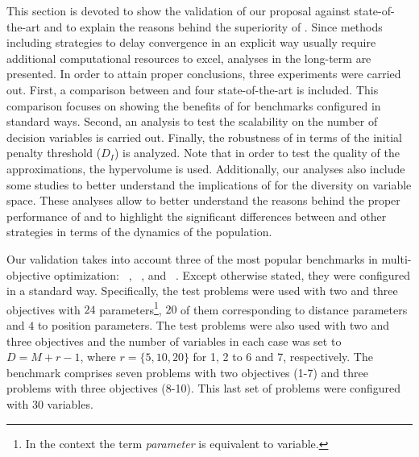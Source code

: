 This section is devoted to show the validation of our proposal against state-of-the-art \MOEAS{} and
to explain the reasons behind the superiority of \AVSDMOEAD{}.
%
%
Since methods including strategies to delay convergence in an explicit way usually require additional computational
resources to excel, analyses in the long-term are presented.
%
In order to attain proper conclusions, three experiments were carried out.
%
First, a comparison between \AVSDMOEAD{} and four state-of-the-art \MOEAS{} is included.
%
This comparison focuses on showing the benefits of \AVSDMOEAD{} for benchmarks 
configured in standard ways.
%
Second, an analysis to test the scalability on the number of decision variables is carried out.
%
Finally, the robustness of \AVSDMOEAD{} in terms of the initial penalty threshold ($D_I$) is analyzed.
%
Note that in order to test the quality of the approximations, the hypervolume is used.
%
Additionally, our analyses also include some studies to better understand
the implications of \AVSDMOEAD{} for the diversity on variable space.
%
These analyses allow to better understand the reasons behind the proper performance of \AVSDMOEAD{}
and to highlight the significant differences between \AVSDMOEAD{} and other strategies in terms of the dynamics
of the population.



Our validation takes into account three of the most popular benchmarks in multi-objective optimization:
\WFG{}~\cite{huband2006review}, \DTLZ{}~\cite{deb2005scalable}, and \UF{}~\cite{zhang2008multiobjective}.
%
Except otherwise stated, they were configured in a standard way.
%
Specifically, the \WFG{} test problems were used with two and three objectives with $24$ 
parameters\footnote{In the \WFG{} context the term \textit{parameter} is equivalent to variable.}, 
$20$ of them corresponding to distance parameters and $4$ to position parameters.
%
The \DTLZ{} test problems were also used with two and three objectives and the number of variables in each
case was set to $D=M+r-1$, where $r=\{5, 10, 20\}$ for \DTLZ{}1, \DTLZ{}2 to \DTLZ{}6 and \DTLZ{}7, respectively.
% 
The \UF{} benchmark comprises seven problems with two objectives (\UF{}1-7) and three problems with three objectives (\UF{}8-10).
%
This last set of problems were configured with $30$ variables.

